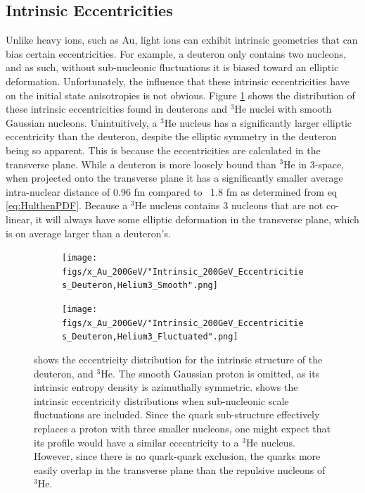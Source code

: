 \documentclass[twocolumn,showpacs,amsfonts,aps,prc,nofootinbib,floatfix]{revtex4}
\begin{document}
\subsection{Intrinsic Eccentricities}
\label{subsec:IntrinsicEccentricities}
Unlike heavy ions, such as Au, light ions can exhibit intrinsic geometries that can bias certain eccentricities. For example, a deuteron only contains two nucleons, and as such, without sub-nucleonic fluctuations it is biased toward an elliptic deformation. Unfortunately, the influence that these intrinsic eccentricities have on the initial state anisotropies is not obvious. Figure \ref{fig:SmFlIntAu} shows the distribution of these intrinsic eccentricities found in deuterons and $^3$He nuclei with smooth Gaussian nucleons. Unintuitively, a $^3$He nucleus has a significantly larger elliptic eccentricity than the deuteron, despite the elliptic symmetry in the deuteron being so apparent. This is because the eccentricities are calculated in the transverse plane. While a deuteron is more loosely bound than $^3$He in 3-space, when projected onto the transverse plane it has a significantly smaller average intra-nuclear distance of 0.96 fm compared to ~1.8 fm as determined from eq \ref{eq:HulthenPDF}. Because a $^3$He nucleus contains 3 nucleons that are not co-linear, it will always have some elliptic deformation in the transverse plane, which is on average larger than a deuteron's. 
\begin{figure}
	\begin{center}
		\begin{subfigure}[t]{0.4\linewidth}
			\texttt{[image: figs/x\_Au\_200GeV/"Intrinsic\_200GeV\_Eccentricities\_Deuteron,Helium3\_Smooth".png]}
			\subcaption{\label{subfig:SmIntAu}}
		\end{subfigure}
		\begin{subfigure}[t]{0.4\linewidth}
			\texttt{[image: figs/x\_Au\_200GeV/"Intrinsic\_200GeV\_Eccentricities\_Deuteron,Helium3\_Fluctuated".png]}
			\subcaption{\label{subfig:FlIntAu}}
		\end{subfigure}
		\caption{ shows the eccentricity distribution for the intrinsic structure of the deuteron, and $^3$He. The smooth Gaussian proton is omitted, as its intrinsic entropy density is azimuthally symmetric.  shows the intrinsic eccentricity distributions when sub-nucleonic scale fluctuations are included. Since the quark sub-structure effectively replaces a proton with three smaller nucleons, one might expect that its profile would have a similar eccentricity to a $^3$He nucleus. However, since there is no quark-quark exclusion, the quarks more easily overlap in the transverse plane than the repulsive nucleons of $^3$He.}
		\label{fig:SmFlIntAu}
	\end{center}
\end{figure}
\end{document}

